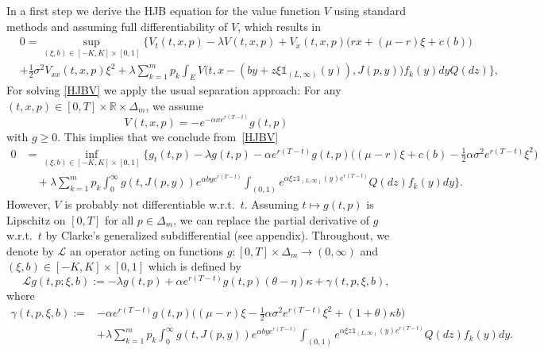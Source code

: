 \documentclass[reqno, 11pt]{amsart}%
\newcommand{\R}{\mathbb{R}}
\theoremstyle{definition}
\numberwithin{equation}{section} \numberwithin{theorem}{section}
\begin{document}
In a first step we derive the HJB equation for the value function $V$ using standard methods and assuming full differentiability of $V$, which results in
\begin{equation}\label{HJBV}
\begin{aligned}
&0=\sup_{(\xi,b)\in[-K,K]\times[0,1]} \bigg\{V_t(t,x,p) - \lambda V(t,x,p) +V_x(t,x,p)\big(rx + (\mu-r)\xi+c(b)\big)  \\
&+ \frac12\sigma^2V_{xx}(t,x,p)\xi^2 + \lambda \sum_{k=1}^m p_k\int_E V\big(t,x-(b y + z\xi\mathds{1}_{(L,\infty)}(y)),J(p,y)\big)f_k(y)dyQ(dz)\bigg\},
\end{aligned}
\end{equation}
For solving \eqref{HJBV} we apply the usual separation approach: For any $(t,x,p)\in[0,T]\times\R\times\Delta_m$, we assume
\begin{equation}\label{separation}
V(t,x,p) = -e^{-\alpha x e^{r(T-t)}}g(t,p)
\end{equation}
with $g\ge 0$. This implies that we conclude from~\eqref{HJBV}
\begin{equation}\label{HJBgdiff}
\begin{aligned}
0&=\inf_{(\xi,b)\in[-K,K]\times[0,1]} \bigg\{g_t(t,p) - \lambda g(t,p) - \alpha e^{r(T-t)}g(t,p)\Big((\mu-r)\xi + c(b) - \frac12\alpha \sigma^2 e^{r(T-t)}\xi^2\Big)  \\
&\quad+\lambda \sum_{k=1}^m p_k \int_0^\infty g(t,J(p,y))e^{\alpha b y e^{r(T-t)}} \int_{(0,1)} e^{\alpha \xi z \mathds{1}_{(L,\infty)}(y)e^{r(T-t)}}Q(dz) f_k(y)dy \bigg\}.
\end{aligned}
\end{equation}
However, $V$ is probably not differentiable w.r.t.\ $t$. Assuming $t\mapsto g(t,p)$ is Lipschitz on $[0,T]$ for all $p\in\Delta_m$, we can replace the partial derivative of $g$ w.r.t.\ $t$ by Clarke's generalized subdifferential (see appendix).
 Throughout, we denote by ${\mathcal L}$ an operator acting on functions $g:[0,T]\times\Delta_m\to(0,\infty)$ and $(\xi,b)\in [-K,K]\times[0,1]$ which is defined by
\begin{equation}\label{L}
{\mathcal L} g(t,p;\xi,b) :=  - \lambda g(t,p)+ \alpha e^{r(T-t)}g(t,p)(\theta-\eta)\kappa + \gamma(t,p,\xi,b),
\end{equation}
where
\begin{equation}\label{eq:gamma}
\begin{aligned}
 \gamma(t,p,\xi,b) := &-\alpha e^{r(T-t)} g(t,p)\Big((\mu-r)\xi -\frac12\alpha\sigma^2 e^{r(T-t)}\xi^2 + (1+\theta) \kappa b\Big) \\
&+\lambda\sum_{k=1}^m p_k \int_0^\infty g(t,J(p,y)) e^{\alpha b y e^{r(T-t)}}\int_{(0,1)}e^{\alpha \xi z \mathds{1}_{(L,\infty)}(y) e^{r(T-t)}}Q(dz)f_k(y)dy.
\end{aligned}
\end{equation}
\end{document}
